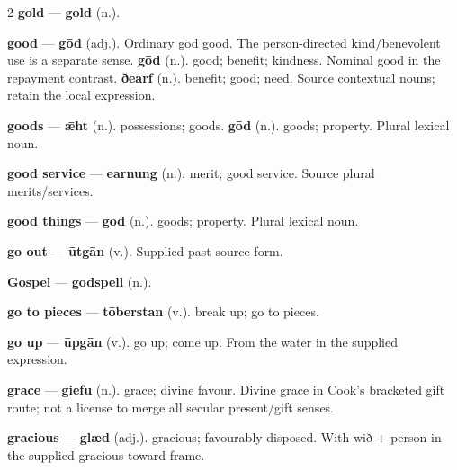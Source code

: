 \begin{multicols}{2}
\textbf{gold} — \textbf{gold} (n.).\par
\textbf{good} — \textbf{gōd} (adj.). Ordinary gōd good. The person-directed kind/benevolent use is a separate sense. \textbf{gōd} (n.). good; benefit; kindness. Nominal good in the repayment contrast. \textbf{ðearf} (n.). benefit; good; need. Source contextual nouns; retain the local expression.\par
\textbf{goods} — \textbf{ǣht} (n.). possessions; goods. \textbf{gōd} (n.). goods; property. Plural lexical noun.\par
\textbf{good service} — \textbf{earnung} (n.). merit; good service. Source plural merits/services.\par
\textbf{good things} — \textbf{gōd} (n.). goods; property. Plural lexical noun.\par
\textbf{go out} — \textbf{ūtgān} (v.). Supplied past source form.\par
\textbf{Gospel} — \textbf{godspell} (n.).\par
\textbf{go to pieces} — \textbf{tōberstan} (v.). break up; go to pieces.\par
\textbf{go up} — \textbf{ūpgān} (v.). go up; come up. From the water in the supplied expression.\par
\textbf{grace} — \textbf{giefu} (n.). grace; divine favour. Divine grace in Cook's bracketed gift route; not a license to merge all secular present/gift senses.\par
\textbf{gracious} — \textbf{glæd} (adj.). gracious; favourably disposed. With wið + person in the supplied gracious-toward frame.\par

\end{multicols}

